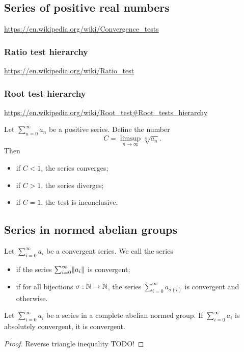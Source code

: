 \subsection{Series of positive real numbers}
\url{https://en.wikipedia.org/wiki/Convergence_tests}
\subsubsection{Ratio test hierarchy}
\url{https://en.wikipedia.org/wiki/Ratio_test}
\subsubsection{Root test hierarchy}
\url{https://en.wikipedia.org/wiki/Root_test#Root_tests_hierarchy}

\begin{proposition} \label{rootTest}
Let $\sum_{n=0}^\infty a_n$ be a positive series. Define the number
\[ C = \limsup_{n\to \infty}\sqrt[n]{a_n}. \]
Then
\begin{itemize}
\item if $C<1$, the series converges;
\item if $C>1$, the series diverges;
\item if $C=1$, the test is inconclusive.
\end{itemize}
\end{proposition}


\subsection{Series in normed abelian groups}
\begin{definition}
Let $\sum_{i=0}^\infty a_i$ be a convergent series. We call the series
\begin{itemize}
\item {} if the series $\sum_{i=0}^\infty \lVert a_i\rVert$ is convergent;
\item {} if for all bijections $\sigma: \mathbb{N}\to \mathbb{N}$, the series $\sum_{i=0}^\infty a_{\sigma(i)}$ is convergent and  otherwise.
\end{itemize}
\end{definition}

\begin{proposition}
Let $\sum_{i=0}^\infty a_i$ be a series in a complete abelian normed group. If $\sum_{i=0}^\infty a_i$ is absolutely convergent, it is convergent.
\end{proposition}
\begin{proof}
Reverse triangle inequality TODO!
\end{proof}

